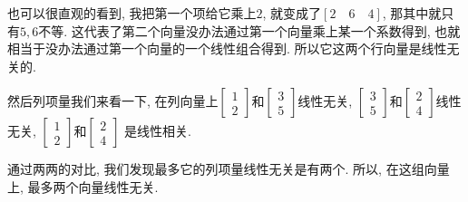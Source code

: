 也可以很直观的看到, 我把第一个项给它乘上$2$, 就变成了$[2 \quad 6 \quad 4]$,  那其中就只有$5, 6$不等. 这代表了第二个向量没办法通过第一个向量乘上某一个系数得到, 也就相当于没办法通过第一个向量的一个线性组合得到. 所以它这两个行向量是线性无关的. 

然后列项量我们来看一下, 在列向量上$\begin{bmatrix} 1 \\ 2 \end{bmatrix}$和$\begin{bmatrix} 3 \\ 5 \end{bmatrix}$线性无关,  $\begin{bmatrix} 3 \\ 5 \end{bmatrix}$和$\begin{bmatrix} 2 \\ 4\end{bmatrix}$线性无关,  $\begin{bmatrix} 1 \\ 2 \end{bmatrix}$和$\begin{bmatrix} 2 \\ 4 \end{bmatrix}$ 是线性相关. 

通过两两的对比, 我们发现最多它的列项量线性无关是有两个. 所以, 在这组向量上, 最多两个向量线性无关. 